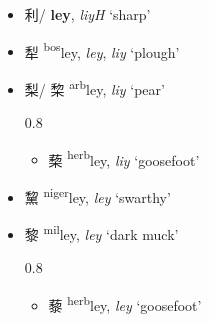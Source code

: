 \begin{itemize}
    \item {\Large{利}}/{\Large{}} %
    {\large{\textbf{ley}}},
    \textit{liyH}  `sharp'                  %


    \item {\Large{犁}} %
    {\large{{\textsuperscript{bos}}ley}},
    \textit{ley}, \textit{liy}    `plough'   %

    \item {\Large{梨}}/ {\Large{棃}}  %
    {\large{{\textsuperscript{arb}}ley}},
    \textit{liy}   `pear'                  %
\vspace{-2mm}
\begin{spacing}{0.8}  
\begin{itemize}
    \item     {\Large{蔾}} %
    {\large{{\textsuperscript{herb}}{ley}}},
    \textit{liy}     `goosefoot'                %


\end{itemize}
\end{spacing}
\vspace{-2mm}


    \item {\Large{黧}} %
    {\large{{\textsuperscript{niger}}ley}},
    \textit{ley}    `swarthy'                 %

    \item {\Large{黎}} %
    {\large{{\textsuperscript{mil}}ley}},
    \textit{ley} `dark muck'                    %
\vspace{-2mm}
\begin{spacing}{0.8}  
\begin{itemize}
    \item {\Large{藜}} %
        {\large{{\textsuperscript{herb}}{ley}}},  
    \textit{ley}    `goosefoot'                 %
\end{itemize}
\end{spacing}
\end{itemize}

